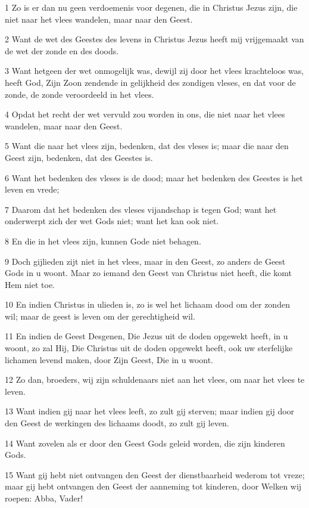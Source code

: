 \par 1 Zo is er dan nu geen verdoemenis voor degenen, die in Christus Jezus zijn, die niet naar het vlees wandelen, maar naar den Geest.
\par 2 Want de wet des Geestes des levens in Christus Jezus heeft mij vrijgemaakt van de wet der zonde en des doods.
\par 3 Want hetgeen der wet onmogelijk was, dewijl zij door het vlees krachteloos was, heeft God, Zijn Zoon zendende in gelijkheid des zondigen vleses, en dat voor de zonde, de zonde veroordeeld in het vlees.
\par 4 Opdat het recht der wet vervuld zou worden in ons, die niet naar het vlees wandelen, maar naar den Geest.
\par 5 Want die naar het vlees zijn, bedenken, dat des vleses is; maar die naar den Geest zijn, bedenken, dat des Geestes is.
\par 6 Want het bedenken des vleses is de dood; maar het bedenken des Geestes is het leven en vrede;
\par 7 Daarom dat het bedenken des vleses vijandschap is tegen God; want het onderwerpt zich der wet Gods niet; want het kan ook niet.
\par 8 En die in het vlees zijn, kunnen Gode niet behagen.
\par 9 Doch gijlieden zijt niet in het vlees, maar in den Geest, zo anders de Geest Gods in u woont. Maar zo iemand den Geest van Christus niet heeft, die komt Hem niet toe.
\par 10 En indien Christus in ulieden is, zo is wel het lichaam dood om der zonden wil; maar de geest is leven om der gerechtigheid wil.
\par 11 En indien de Geest Desgenen, Die Jezus uit de doden opgewekt heeft, in u woont, zo zal Hij, Die Christus uit de doden opgewekt heeft, ook uw sterfelijke lichamen levend maken, door Zijn Geest, Die in u woont.
\par 12 Zo dan, broeders, wij zijn schuldenaars niet aan het vlees, om naar het vlees te leven.
\par 13 Want indien gij naar het vlees leeft, zo zult gij sterven; maar indien gij door den Geest de werkingen des lichaams doodt, zo zult gij leven.
\par 14 Want zovelen als er door den Geest Gods geleid worden, die zijn kinderen Gods.
\par 15 Want gij hebt niet ontvangen den Geest der dienstbaarheid wederom tot vreze; maar gij hebt ontvangen den Geest der aanneming tot kinderen, door Welken wij roepen: Abba, Vader!
